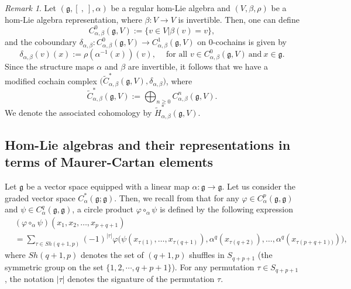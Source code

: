 \documentclass[a4paper,11pt]{amsart}
\theoremstyle{plain}
\theoremstyle{definition}
\theoremstyle{remark}
\newtheorem{remark}[theorem]{Remark}
\numberwithin{equation}{section}
\begin{document}
\begin{remark}\label{regular hom-Lie algebra cohomology}
Let $(\mathfrak{g},[~,~],\alpha)$ be a regular hom-Lie algebra and $(V, \beta, \rho)$ be a hom-Lie algebra representation, where $\beta:V\rightarrow V$ is invertible. Then, one can define 
$$C^0_{\alpha,\beta}(\mathfrak{g},V):=\{v\in V| \beta(v)=v\},$$
and the coboundary $\delta_{\alpha,\beta}:C^0_{\alpha,\beta}(\mathfrak{g},V)\rightarrow C^1_{\alpha,\beta}(\mathfrak{g},V)$ on $0$-cochains is given by
$$\delta_{\alpha,\beta}(v)(x):=\rho(\alpha^{-1}(x))(v),~\quad\mbox{for all }v\in C^0_{\alpha,\beta}(\mathfrak{g},V) ~\mbox{and}~ x\in \mathfrak{g}.$$
Since the structure maps $\alpha$ and $\beta$ are invertible, it follows that we have a modified cochain complex $\big(\widetilde{C}^*_{\alpha,\beta}(\mathfrak{g},V),\delta_{\alpha,\beta}\big)$, where 
$$\widetilde{C}^*_{\alpha,\beta}(\mathfrak{g},V):=\bigoplus_{n\geq 0} C^n_{\alpha,\beta}(\mathfrak{g},V).$$
We denote the associated cohomology by $\widetilde{H}^*_{\alpha,\beta}(\mathfrak{g},V)$.
\end{remark}

\subsection{Hom-Lie algebras and their representations in terms of Maurer-Cartan elements}
Let $\mathfrak{g}$ be a vector space equipped with a linear map $\alpha:\mathfrak{g}\rightarrow\mathfrak{g}$. Let us consider the graded vector space $C^*_{\alpha}(\mathfrak{g};\mathfrak{g})$. Then, we recall from  \cite{DefHLIE} that for any $\varphi\in C^p_{\alpha}(\mathfrak{g},\mathfrak{g})$ and $\psi\in C^q_{\alpha}(\mathfrak{g},\mathfrak{g})$, a circle product $\varphi\circ_\alpha \psi$ is defined by the following expression
\begin{equation}\label{Defofcirc}
\begin{split}
&(\varphi \circ_{\alpha} \psi)(x_1, x_2, \ldots, x_{p+q+1})\\ &= \textstyle{\sum\limits_{\tau \in Sh (q+1, p)} (-1)^{|\tau|}
\varphi \big(\psi (x_{\tau(1)}, \ldots, x_{\tau (q+1)}),\alpha^q(x_{\tau (q+2)}) , \ldots, \alpha^q(x_{\tau (p+q+1))}) \big)},
\end{split}
\end{equation}
where $Sh (q+1, p)$ denotes the set of $(q+1,p)$ shuffles in $S_{q+p+1}$ (the symmetric group on the set $\{1,2,\cdots,q+p+1\}$). For any permutation $\tau\in S_{q+p+1}$, the notation $|\tau|$ denotes the signature of the permutation $\tau$. 
\end{document}
